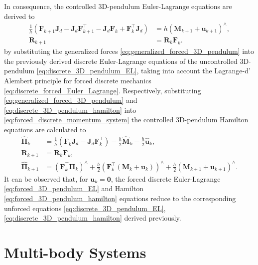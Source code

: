 In consequence, the controlled 3D-pendulum Euler-Lagrange
equations are derived to 
\begin{subequations}\label{eq:forced_3D_pendulum_EL}
\begin{align}
    \label{eq:forced_3D_pendulum_EL_dynamics}
    \frac{1}{h}\left(
        \bm{F}_{k+1}\bm{J}_d
        - \bm{J}_d\bm{F}_{k+1}^{\top}
        - \bm{J}_d\bm{F}_k
        + \bm{F}_k^{\top}\bm{J}_d
    \right)
    &=
    h\left(\bm{M}_{k+1} + \bm{u}_{k+1}\right)^\wedge,
    \\
    \label{eq:forced_3D_pendulum_EL_kinematics}
    \bm{R}_{k+1} &= \bm{R}_k \bm{F}_k.
\end{align}
\end{subequations}
by substituting the generalized forces \eqref{eq:generalized_forced_3D_pendulum} into 
the previously derived discrete Euler-Lagrange equations of the uncontrolled 
3D-pendulum \eqref{eq:discrete_3D_pendulum_EL}, taking into account 
the Lagrange-d' Alembert principle for forced discrete mechanics \eqref{eq:discrete_forced_Euler_Lagrange}.
Respectively, substituting \eqref{eq:generalized_forced_3D_pendulum} and 
\eqref{eq:discrete_3D_pendulum_hamilton} into \eqref{eq:forced_discrete_momentum_system} the controlled 3D-pendulum Hamilton equations are calculated to 
\begin{subequations}\label{eq:forced_3D_pendulum_hamilton}
\begin{align}
    \label{eq:forced_3D_pendulum_hamilton_1}
    \hat{\bm{\Pi}}_k
    &=
    \frac{1}{h}\left(
        \bm{F}_k \bm{J}_d
        - \bm{J}_d \bm{F}_k^{\top}
    \right)
    - \frac{h}{2}\hat{\bm{M}}_k
    - \frac{h}{2}\hat{\bm{u}}_k, \\
    \label{eq:forced_3D_pendulum_hamilton_2}
    \bm{R}_{k+1}
    &=
    \bm{R}_k \bm{F}_k, \\
    \label{eq:forced_3D_pendulum_hamilton_3}
    \hat{\bm{\Pi}}_{k+1}
    &=
    (\bm{F}_k^\top \bm{\Pi}_k)^\wedge
    + \frac{h}{2}\left(\bm{F}_k^\top(\bm{M}_k + \bm{u}_k)\right)^\wedge
    + \frac{h}{2}(\bm{M}_{k+1} + \bm{u}_{k+1})^\wedge.
\end{align}
\end{subequations}
It can be observed that, for $\bm{u}_k=\bm{0}$, the forced discrete Euler-Lagrange \eqref{eq:forced_3D_pendulum_EL} and Hamilton \eqref{eq:forced_3D_pendulum_hamilton} equations 
reduce to the corresponding unforced equations \eqref{eq:discrete_3D_pendulum_EL}, \eqref{eq:discrete_3D_pendulum_hamilton} derived previously.

\section{Multi-body Systems}
\label{sec:multi_body_systems}

